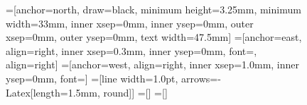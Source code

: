 \documentclass[twocolumn,letter,10pt]{IEEEtran} %
\begin{document}
\begin{figure}[!htbp]
	\pgfmathsetlengthmacro\LblR{5mm}
	\pgfmathsetlengthmacro\LblL{6mm}
	\pgfmathsetlengthmacro\AllLayerWidth{1.75mm}
	\pgfmathsetlengthmacro\InnerLayerSep{3.9mm}
	\pgfmathsetlengthmacro\InnerLayerSepMerge{0.6mm}
	\pgfmathsetlengthmacro\SkpXShift{2mm}



	\def\vsvsin{-2.75mm}
	\def\vshdin{-0.90mm}
	\def\vshdot{-1.99mm}
	\def\vsvsot{-2.75mm}

	\def\CONVHeight{3.25mm}
	\def\CONVWidth{33mm}

	=[anchor=north, draw=black, minimum height=\CONVHeight, minimum width=\CONVWidth,
	inner xsep=0mm, inner ysep=0mm, outer xsep=0mm, outer ysep=0mm, text width=47.5mm]
	=[anchor=east, align=right, inner xsep=0.3mm, inner ysep=0mm, font={\tiny}, align=right]
	=[anchor=west, align=right, inner xsep=1.0mm, inner ysep=0mm, font={\scriptsize}]
	=[line width=1.0pt, arrows={-{Latex[length=1.5mm, round]}}]
	=[]
	=[]


	\centering
	\scriptsize
	\begin{tikzpicture}



\end{tikzpicture}
\end{figure}
\end{document}
